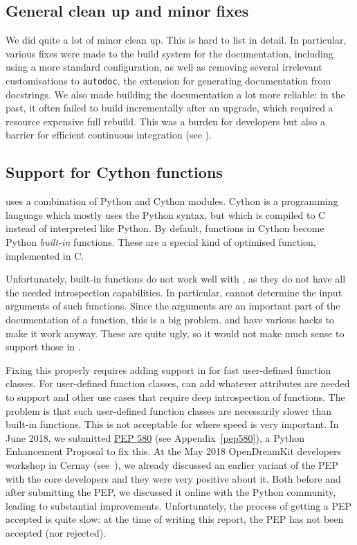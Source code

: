 \documentclass{deliverablereport}
\begin{document}
\subsection{General clean up and minor fixes}

We did quite a lot of minor clean up.
This is hard to list in detail.
In particular, various fixes were made to the build system for the documentation,
including using a more standard \Sphinx configuration, as well as
removing several irrelevant customisations to \texttt{autodoc},
the extension for generating documentation from docstrings.
We also made building the \Sage documentation a lot more reliable:
in the past, it often failed to build incrementally after an upgrade,
which required a resource expensive full rebuild. This was a burden
for developers but also a barrier for efficient continuous integration
(see ).

\subsection{Support for Cython functions}\label{cython}

\Sage uses a combination of Python and Cython modules.
Cython is a programming language which mostly uses the Python syntax,
but which is compiled to C instead of interpreted like Python.
By default, functions in Cython become Python \emph{built-in} functions.
These are a special kind of optimised function, implemented in C.

Unfortunately, built-in functions do not work well with \Sphinx, as they
do not have all the needed introspection capabilities.
In particular, \Sphinx cannot determine the input arguments of such functions.
Since the arguments are an important part of the documentation
of a function, this is a big problem.
\Sage and \Cython have various hacks to make it work anyway.
These are quite ugly, so it would not make much sense to support those in \Sphinx.

Fixing this properly requires adding support in \Python
for fast user-defined function classes.
For user-defined function classes, \Cython can add whatever attributes
are needed to support \Sphinx and other use cases that require deep introspection
of functions.
The problem is that such user-defined function classes
are necessarily slower than built-in functions.
This is not acceptable for \Sage where speed is very important.
In June 2018, we submitted
\href{https://www.python.org/dev/peps/pep-0580/}{PEP 580} (see Appendix~\ref{pep580}), a Python Enhancement Proposal to fix this.
At the May 2018 OpenDreamKit developers workshop in Cernay
(see~),
we already discussed an earlier variant of the PEP
with the core \Cython developers and they were very positive about it.
Both before and after submitting the PEP,
we discussed it online with the Python community,
leading to substantial improvements.
Unfortunately, the process of getting a PEP accepted is quite slow:
at the time of writing this report, the PEP has not been accepted (nor rejected).
\end{document}
